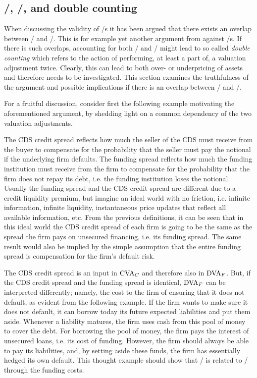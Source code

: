 \documentclass[main.tex]{subfiles}
\begin{document}
    \subsection{\FVA/, \DVA/, and double counting}

    When discussing the validity of \FVA/s it has been argued
    that there exists an overlap between \FVA/ and \DVA/.
    This is for example yet another argument from \textcite{HullWhite2012FVA} against \FVA/s.
    If there is such overlaps, accounting for both \FVA/ and \DVA/
    might lead to so called \textit{double counting}
    which refers to the action of performing, at least a part of, a valuation adjustment twice. 
    Clearly, this can lead to both over- or underpricing of assets
    and therefore needs to be investigated.
    This section examines the truthfulness of the argument and possible implications 
    if there is an overlap between \FVA/ and \DVA/.

    For a fruitful discussion, 
    consider first the following example motivating the aforementioned argument,
    by shedding light on a common dependency of the two valuation adjustments.

    The CDS credit spread reflects how much the seller of the CDS must receive from the buyer
    to compensate for the probability that the seller must pay the notional 
    if the underlying firm defaults.
    The funding spread reflects how much the funding institution must receive from the firm 
    to compensate for the probability that the firm does not repay its debt, 
    i.e. the funding institution loses the notional.
    Usually the funding spread and the CDS credit spread 
    are different due to a credit liquidity premium,
    but imagine an ideal world with no friction, i.e. infinite information, infinite liquidity, 
    instantaneous price updates that reflect all available information, etc.
    From the previous definitions, it can be seen that in this ideal world
    the CDS credit spread of each firm is going to be the same 
    as the spread the firm pays on unsecured financing, i.e. its funding spread.
    The same result would also be implied by the simple assumption 
    that the entire funding spread is compensation for the firm's default risk.

    The CDS credit spread is an input in $\CVA/_{C}$ and therefore also in $\DVA/_{F}$.
    But, if the CDS credit spread and the funding spread is identical, 
    $\DVA/_{F}$ can be interpreted differently;
    namely, the cost to the firm of ensuring that it does not default, 
    as evident from the following example.
    If the firm wants to make sure it does not default,
    it can borrow today its future expected liabilities and put them aside.
    Whenever a liability matures, the firm uses cash from this pool of money to cover the debt.
    For borrowing the pool of money, the firm pays the interest of unsecured loans, 
    i.e. its cost of funding.
    However, the firm should always be able to pay its liabilities,
    and, by setting aside these funds, the firm has essentially hedged its own default. 
    This thought example should show that \DVA/ is related to \FVA/ through the funding costs.
    
\end{document}
